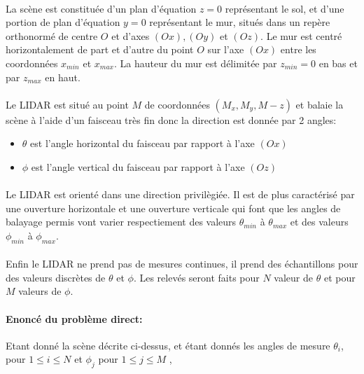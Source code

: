 \documentclass[12pt,a4paper]{report}
\begin{document}
\paragraph{} La scène est constituée d'un plan d'équation $z = 0$ représentant le sol, et d'une portion de plan d'équation $y=0$ représentant le mur, situés dans un repère orthonormé de centre $O$ et d'axes $(Ox), (Oy)$ et $(Oz)$. Le mur est centré horizontalement de part et d'autre du point $O$ sur l'axe $(Ox)$ entre les coordonnées $x_{min}$ et $x_{max}$. La hauteur du mur est délimitée par $z_{min} = 0$ en bas et par $z_{max}$ en haut.

\paragraph{} Le LIDAR est situé au point $M$ de coordonnées $(M_x, M_y, M-z)$ et balaie la scène à l'aide d'un faisceau très fin donc la direction est donnée par 2 angles:
\begin{itemize}
	\item $\theta$ est l'angle horizontal du faisceau par rapport à l'axe $(Ox)$
	\item $\phi$ est l'angle vertical du faisceau par rapport à l'axe $(Oz)$
\end{itemize}

\paragraph{}Le LIDAR est orienté dans une direction privilègiée. Il est de plus caractérisé par une ouverture horizontale et une ouverture verticale qui font que les angles de balayage permis vont varier respectiement des valeurs $\theta_{min}$ à $\theta_{max}$ et des valeurs $\phi_{min}$ à $\phi_{max}$.

\paragraph{} Enfin le LIDAR ne prend pas de mesures continues, il prend des échantillons pour des valeurs discrètes de $\theta$ et $\phi$. Les relevés seront faits pour $N$ valeur de $\theta$ et pour $M$ valeurs de $\phi$.

\paragraph{Enoncé du problème direct:} Etant donné la scène décrite ci-dessus, et étant donnés les angles de mesure $\theta_i$, pour $1 \leq i \leq N$ et $\phi_j$ pour $1 \leq j \leq M$ , 
\end{document}
